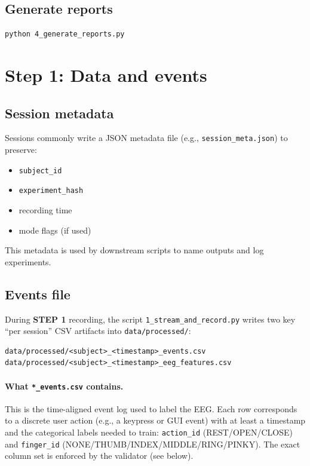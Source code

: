 \documentclass[11pt]{article}
\begin{document}
\subsection{Generate reports}
\begin{lstlisting}
python 4_generate_reports.py
\end{lstlisting}

\section{Step 1: Data and events}
\subsection{Session metadata}
Sessions commonly write a JSON metadata file (e.g., \texttt{session\_meta.json}) to preserve:
\begin{itemize}[leftmargin=*]
\item \texttt{subject\_id}
\item \texttt{experiment\_hash}
\item recording time
\item mode flags (if used)
\end{itemize}
This metadata is used by downstream scripts to name outputs and log experiments.

\subsection{Events file}
During \textbf{STEP 1} recording, the script \texttt{1\_stream\_and\_record.py} writes two key ``per session'' CSV artifacts into \texttt{data/processed/}:

\begin{lstlisting}
data/processed/<subject>_<timestamp>_events.csv
data/processed/<subject>_<timestamp>_eeg_features.csv
\end{lstlisting}

\paragraph{What \texttt{*\_events.csv} contains.}
This is the time-aligned event log used to label the EEG. Each row corresponds to a discrete user action (e.g., a keypress or GUI event) with at least a timestamp and the categorical labels needed to train:
\texttt{action\_id} (REST/OPEN/CLOSE) and \texttt{finger\_id} (NONE/THUMB/INDEX/MIDDLE/RING/PINKY). The exact column set is enforced by the validator (see below).
\end{document}
